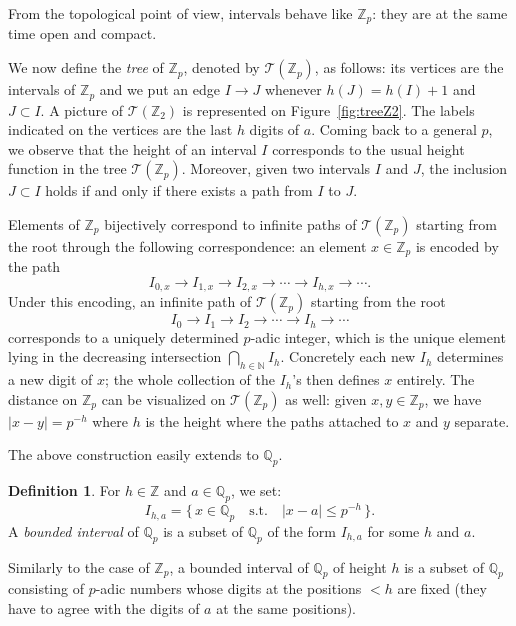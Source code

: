 \documentclass[11pt]{article}
\numberwithin{equation}{section}
\numberwithin{figure}{section}
\renewcommand{\leq}{\leqslant}
\theoremstyle{definition}
\newtheorem{deftn}[theo]{Definition}
\newcommand{\N}{\mathbb N}
\newcommand{\Z}{\mathbb Z}
\newcommand{\Zp}{\Z_p}
\newcommand{\Q}{\mathbb Q}
\newcommand{\Qp}{\Q_p}
\newcommand{\calT}{\mathcal T}
\begin{document}
From the topological point of view, intervals behave like $\Zp$:
they are at the same time open and compact.

\medskip

We now define the \emph{tree} of $\Zp$, denoted by $\calT(\Zp)$, as follows:
its vertices are the intervals of $\Zp$ and we put an edge $I \to J$ 
whenever $h(J) = h(I) + 1$ and $J \subset I$. 
A picture of $\calT(\Z_2)$ is represented on Figure~\ref{fig:treeZ2}.
The labels indicated on the vertices are the last $h$ digits of $a$.
Coming back to a general $p$, 
we observe that the height of an interval $I$ corresponds to the 
usual height function in the tree $\calT(\Zp)$. Moreover, given two 
intervals $I$ and $J$, the inclusion $J \subset I$ holds if and only 
if there exists a path from $I$ to $J$. 

Elements of $\Zp$ bijectively correspond to infinite paths of 
$\calT(\Zp)$ starting from the root through the following 
correspondence: an element $x \in \Zp$ is encoded by the path
$$I_{0,x} \to I_{1,x} \to I_{2,x} \to \cdots \to I_{h,x} \to \cdots.$$
Under this encoding, an infinite path of $\calT(\Zp)$ starting from the 
root 
$$I_0 \to I_1 \to I_2 \to \cdots \to I_h \to \cdots$$ 
corresponds to a uniquely determined $p$-adic integer, which is the 
unique element lying in the decreasing intersection $\bigcap_{h \in \N} 
I_h$. Concretely each new $I_h$ determines a new digit of $x$; the whole 
collection of the $I_h$'s then defines $x$ entirely.
The distance on $\Zp$ can be visualized on $\calT(\Zp)$ as well:
given $x, y \in \Zp$, we have $|x-y| = p^{-h}$ where $h$ is the height
where the paths attached to $x$ and $y$ separate.

\medskip

The above construction easily extends to $\Qp$.

\begin{deftn}
\label{def:intervalQp}
For $h \in \Z$ and $a \in\Qp$, we set:
$$I_{h,a} = \big\{ \, x \in \Qp 
\quad \text{s.t.} \quad 
|x - a| \leq p^{-h} \, \big\}.$$
A \emph{bounded interval} of $\Qp$ is a subset of $\Qp$ of the form
$I_{h,a}$ for some $h$ and $a$.
\end{deftn}

Similarly to the case of $\Zp$, a bounded interval of $\Qp$ of height 
$h$ is a subset of $\Qp$ consisting of $p$-adic numbers whose digits at 
the positions $< h$ are fixed (they have to agree with the digits
of $a$ at the same positions).
\end{document}
